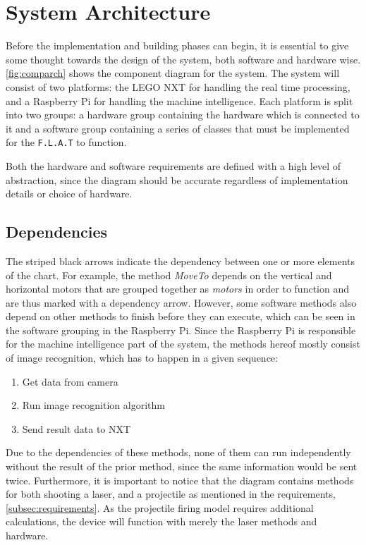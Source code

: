 \section{System Architecture}
\label{sec:architecture}
Before the implementation and building phases can begin, it is essential to give some thought towards the design of the system, both software and hardware wise.
\autoref{fig:comparch} shows the component diagram for the system.
The system will consist of two platforms: the LEGO NXT for handling the real time processing, and a Raspberry Pi for handling the machine intelligence.
Each platform is split into two groups: a hardware group containing the hardware which is connected to it and a software group containing a series of classes that must be implemented for the \texttt{F.L.A.T} to function.

Both the hardware and software requirements are defined with a high level of abstraction, since the diagram should be accurate regardless of implementation details or choice of hardware.

\subsection*{Dependencies}
The striped black arrows indicate the dependency between one or more elements of the chart.
For example, the method \textit{MoveTo} depends on the vertical and horizontal motors that are grouped together as \textit{motors} in order to function and are thus marked with a dependency arrow.
However, some software methods also depend on other methods to finish before they can execute, which can be seen in the software grouping in the Raspberry Pi.
Since the Raspberry Pi is responsible for the machine intelligence part of the system, the methods hereof mostly consist of image recognition, which has to happen in a given sequence:
\begin{enumerate}
\item Get data from camera
\item Run image recognition algorithm
\item Send result data to NXT
\end{enumerate}

Due to the dependencies of these methods, none of them can run independently without the result of the prior method, since the same information would be sent twice.
Furthermore, it is important to notice that the diagram contains methods for both shooting a laser, and a projectile as mentioned in the requirements, \autoref{subsec:requirements}.
As the projectile firing model requires additional calculations, the device will function with merely the laser methods and hardware. 

